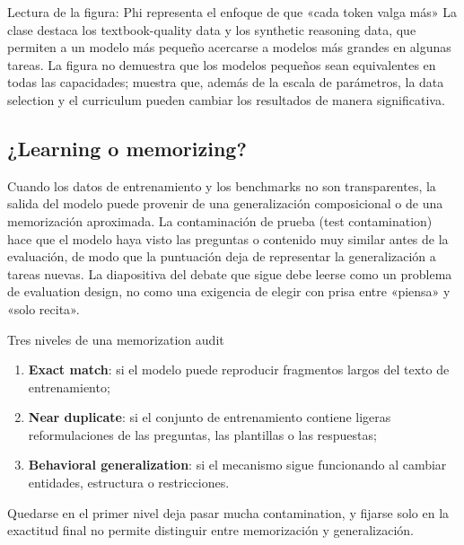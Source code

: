 \begin{knowledgebox}{Lectura de la figura: Phi representa el enfoque de que «cada token valga más»}
La clase destaca los textbook-quality data y los synthetic reasoning data, que permiten a un modelo más pequeño acercarse a modelos más grandes en algunas tareas. La figura no demuestra que los modelos pequeños sean equivalentes en todas las capacidades; muestra que, además de la escala de parámetros, la data selection y el curriculum pueden cambiar los resultados de manera significativa.
\end{knowledgebox}

\subsection{¿Learning o memorizing?}

Cuando los datos de entrenamiento y los benchmarks no son transparentes, la salida del modelo puede provenir de una generalización composicional o de una memorización aproximada. La contaminación de prueba (test contamination) hace que el modelo haya visto las preguntas o contenido muy similar antes de la evaluación, de modo que la puntuación deja de representar la generalización a tareas nuevas. La diapositiva del debate que sigue debe leerse como un problema de evaluation design, no como una exigencia de elegir con prisa entre «piensa» y «solo recita».


\begin{importantbox}{Tres niveles de una memorization audit}
\begin{enumerate}
  \item \textbf{Exact match}: si el modelo puede reproducir fragmentos largos del texto de entrenamiento;
  \item \textbf{Near duplicate}: si el conjunto de entrenamiento contiene ligeras reformulaciones de las preguntas, las plantillas o las respuestas;
  \item \textbf{Behavioral generalization}: si el mecanismo sigue funcionando al cambiar entidades, estructura o restricciones.
\end{enumerate}
Quedarse en el primer nivel deja pasar mucha contamination, y fijarse solo en la exactitud final no permite distinguir entre memorización y generalización.
\end{importantbox}

